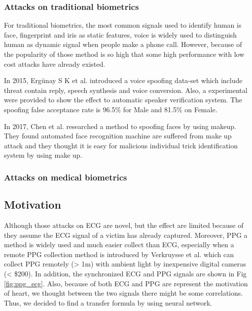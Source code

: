 \documentclass[a4paper,12pt]{article}
\begin{document}
\subsubsection{Attacks on traditional biometrics}
For traditional biometrics, the most common signals used to identify human is face, fingerprint and iris as static features, voice is widely used to distinguish human as dynamic signal when people make a phone call. However, because of the popularity of those method is so high that some high performance with low cost attacks have already existed.

In 2015, Ergünay S K et al. \autocite{Ergunay:2015voicevulnerability} introduced a voice spoofing data-set which include threat contain reply, speech synthesis and voice conversion. Also, a experimental were provided to show the effect to automatic speaker verification system. The spoofing false acceptance rate is 96.5\% for Male and 81.5\% on Female.

In 2017, Chen et al. \autocite{Chen:2017spoofing}researched a method to spoofing faces by using makeup. They found automated face recognition machine are suffered from make up attack and they thought it is easy for malicious individual trick identification system by using make up. 

\subsubsection{Attacks on medical biometrics}


\subsection{Motivation}
Although those attacks on ECG are novel, but the effect are limited because of they assume the ECG signal of a victim has already captured\parencite{Blasco:2018feasibility}. Moreover, PPG a method is widely used and much easier collect than ECG, especially when a remote PPG collection method is introduced by Verkruysse et al. which can collect PPG remotely (> 1m) with ambient light by inexpensive digital cameras (< \$200)\parencite{Verkruysse2008remotePPG}. In addition, the synchronized ECG and PPG signals are shown in Fig \ref{fig:ppg_ecg}. Also, because of both ECG and PPG are represent the motivation of heart, we thought between the two signals there might be some correlations. Thus, we decided to find a transfer formula by using neural network.
\end{document}
